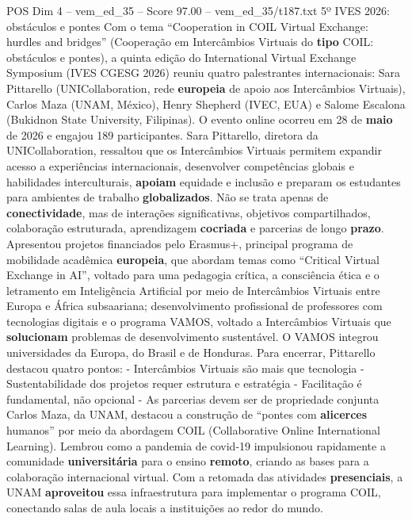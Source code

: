 \begin{textsample}{POS Dim 4 – vem\_ed\_35 – Score 97.00 – vem\_ed\_35/t187.txt}  \label{ex:f4_pos_001}
5º IVES 2026: obstáculos e pontes Com o tema “Cooperation in COIL Virtual Exchange: hurdles and bridges” (Cooperação em Intercâmbios Virtuais do \textbf{tipo} COIL: obstáculos e pontes), a quinta edição do International Virtual Exchange Symposium (IVES CGESG 2026) reuniu quatro palestrantes internacionais: Sara Pittarello (UNICollaboration, rede \textbf{europeia} de apoio aos Intercâmbios Virtuais), Carlos Maza (UNAM, México), Henry Shepherd (IVEC, EUA) e Salome Escalona (Bukidnon State University, Filipinas).
O evento online ocorreu em 28 de \textbf{maio} de 2026 e engajou 189 participantes.
Sara Pittarello, diretora da UNICollaboration, ressaltou que os Intercâmbios Virtuais permitem expandir acesso a experiências internacionais, desenvolver competências globais e habilidades interculturais, \textbf{apoiam} equidade e inclusão e preparam os estudantes para ambientes de trabalho \textbf{globalizados}.
Não se trata apenas de \textbf{conectividade}, mas de interações significativas, objetivos compartilhados, colaboração estruturada, aprendizagem \textbf{cocriada} e parcerias de longo \textbf{prazo}.
Apresentou projetos financiados pelo Erasmus+, principal programa de mobilidade acadêmica \textbf{europeia}, que abordam temas como “Critical Virtual Exchange in AI”, voltado para uma pedagogia crítica, a consciência ética e o letramento em Inteligência Artificial por meio de Intercâmbios Virtuais entre Europa e África subsaariana; desenvolvimento profissional de professores com tecnologias digitais e o programa VAMOS, voltado a Intercâmbios Virtuais que \textbf{solucionam} problemas de desenvolvimento sustentável.
O VAMOS integrou universidades da Europa, do Brasil e de Honduras.
Para encerrar, Pittarello destacou quatro pontos: - Intercâmbios Virtuais são mais que tecnologia - Sustentabilidade dos projetos requer estrutura e estratégia - Facilitação é fundamental, não opcional - As parcerias devem ser de propriedade conjunta Carlos Maza, da UNAM, destacou a construção de “pontes com \textbf{alicerces} humanos” por meio da abordagem COIL (Collaborative Online International Learning).
Lembrou como a pandemia de covid-19 impulsionou rapidamente a comunidade \textbf{universitária} para o ensino \textbf{remoto}, criando as bases para a colaboração internacional virtual.
Com a retomada das atividades \textbf{presenciais}, a UNAM \textbf{aproveitou} essa infraestrutura para implementar o programa COIL, conectando salas de aula locais a instituições ao redor do mundo.

\end{textsample}
